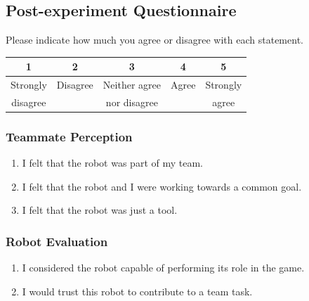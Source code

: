 \subsection{Post-experiment Questionnaire}

Please indicate how much you agree or disagree with each statement.

\begin{center}
\renewcommand{\arraystretch}{1.3}
\begin{tabular}{ccccc}
\toprule
1 & 2 & 3 & 4 & 5 \\
\midrule
Strongly & Disagree & Neither agree & Agree & Strongly \\
disagree & & nor disagree & & agree \\
\bottomrule
\end{tabular}
\end{center}

\vspace{0.5em}

\subsubsection{Teammate Perception}

\begin{enumerate}[leftmargin=*, itemsep=0.8em]

    \item I felt that the robot was part of my team.

    \item I felt that the robot and I were working towards a common goal.

    \item I felt that the robot was just a tool.

\end{enumerate}

\subsubsection{Robot Evaluation}

\begin{enumerate}[leftmargin=*, itemsep=0.8em, start=4]

    \item I considered the robot capable of performing its role in the game.

    \item I would trust this robot to contribute to a team task.

\end{enumerate}

